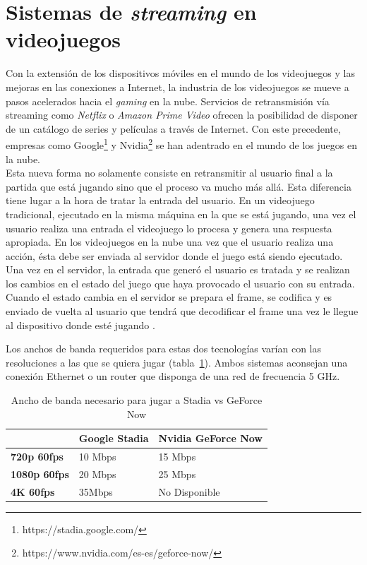 \section{Sistemas de \textit{streaming} en videojuegos}

Con la extensi\'on de los dispositivos m\'oviles en el mundo de los videojuegos y las mejoras en las conexiones a Internet, la industria de los videojuegos se mueve a pasos acelerados hacia el \textit{gaming} en la nube. Servicios de retransmisi\'on v\'ia streaming como \textit{Netflix} o \textit{Amazon Prime Video} ofrecen la posibilidad de disponer de un cat\'alogo de series y pel\'iculas a trav\'es de Internet. Con este precedente, empresas como Google\footnote{https://stadia.google.com/} y Nvidia\footnote{https://www.nvidia.com/es-es/geforce-now/} se han adentrado en el mundo de los juegos en la nube.\\

Esta nueva forma no solamente consiste en retransmitir al usuario final a la partida que est\'a jugando sino que el proceso va mucho m\'as all\'a. Esta diferencia tiene lugar a la hora de tratar la entrada del usuario. En un videojuego tradicional, ejecutado en la misma m\'aquina en la que se est\'a jugando, una vez el usuario realiza una entrada el videojuego lo procesa y genera una respuesta apropiada. En los videojuegos en la nube una vez que el usuario realiza una acci\'on, \'esta debe ser enviada al servidor donde el juego est\'a siendo ejecutado. Una vez en el servidor, la entrada que gener\'o el usuario es tratada y se realizan los cambios en el estado del juego que haya provocado el usuario con su entrada. Cuando el estado cambia en el servidor se prepara el frame, se codifica y es enviado de vuelta al usuario que tendr\'a que decodificar el frame una vez le llegue al dispositivo donde est\'e jugando \citep{cloudgaming}.

Los anchos de banda requeridos para estas dos tecnolog\'ias var\'ian con las resoluciones a las que se quiera jugar (tabla~\ref{stadiovsgeforce}). Ambos sistemas aconsejan una conexi\'on Ethernet o un router que disponga de una red de frecuencia 5 GHz.

\begin{table}[h]
\centering
    \begin{tabular}{lll}
        \toprule
         & \textbf{Google Stadia} & \textbf{Nvidia GeForce Now} \\
        \midrule
        \textbf{720p 60fps} & 10 Mbps & 15 Mbps\\
        \textbf{1080p 60fps} & 20 Mbps & 25 Mbps \\
		\textbf{4K 60fps} & 35Mbps & No Disponible \\
        \bottomrule
    \end{tabular}
\caption{Ancho de banda necesario para jugar a Stadia vs GeForce Now}
\label{stadiovsgeforce}
\end{table}


